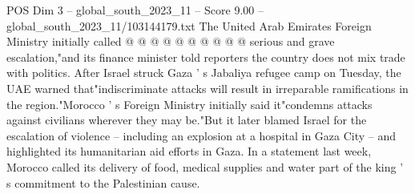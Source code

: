 \begin{textsample}{POS Dim 3 – global\_south\_2023\_11 – Score 9.00 – global\_south\_2023\_11/103144179.txt}
The United Arab Emirates Foreign Ministry initially called @ @ @ @ @ @ @ @ @ @ serious and grave escalation,"and its finance minister told reporters the country does not mix trade with politics.
After Israel struck Gaza ' s Jabaliya refugee camp on Tuesday, the UAE warned that"indiscriminate attacks will result in irreparable ramifications in the region."Morocco ' s Foreign Ministry initially said it"condemns attacks against civilians wherever they may be."But it later blamed Israel for the escalation of violence -- including an explosion at a hospital in Gaza City -- and highlighted its humanitarian aid efforts in Gaza.
In a statement last week, Morocco called its delivery of food, medical supplies and water part of the king ' s commitment to the Palestinian cause.

\end{textsample}
